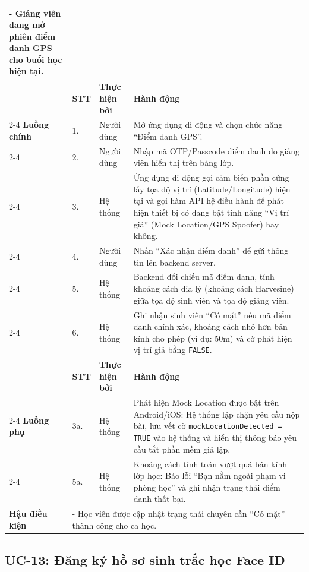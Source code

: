 \documentclass[../DoAn.tex]{subfiles}
\begin{document}
\begin{longtable}{|p{2.8cm}|p{0.8cm}|p{2.2cm}|p{7.5cm}|}
{      - Giảng viên đang mở phiên điểm danh GPS cho buổi học hiện tại.} \\ \hline
     & \textbf{STT} & \textbf{Thực hiện bởi} & \textbf{Hành động} \\ \cline{2-4}
    \textbf{Luồng chính} & 1. & Người dùng & Mở ứng dụng di động và chọn chức năng ``Điểm danh GPS''. \\ \cline{2-4}
     & 2. & Người dùng & Nhập mã OTP/Passcode điểm danh do giảng viên hiển thị trên bảng lớp. \\ \cline{2-4}
     & 3. & Hệ thống & Ứng dụng di động gọi cảm biến phần cứng lấy tọa độ vị trí (Latitude/Longitude) hiện tại và gọi hàm API hệ điều hành để phát hiện thiết bị có đang bật tính năng ``Vị trí giả'' (Mock Location/GPS Spoofer) hay không. \\ \cline{2-4}
     & 4. & Người dùng & Nhấn ``Xác nhận điểm danh'' để gửi thông tin lên backend server. \\ \cline{2-4}
     & 5. & Hệ thống & Backend đối chiếu mã điểm danh, tính khoảng cách địa lý (khoảng cách Harvesine) giữa tọa độ sinh viên và tọa độ giảng viên. \\ \cline{2-4}
     & 6. & Hệ thống & Ghi nhận sinh viên ``Có mặt'' nếu mã điểm danh chính xác, khoảng cách nhỏ hơn bán kính cho phép (ví dụ: 50m) và cờ phát hiện vị trí giả bằng \texttt{FALSE}. \\ \hline
     & \textbf{STT} & \textbf{Thực hiện bởi} & \textbf{Hành động} \\ \cline{2-4}
    \textbf{Luồng phụ} & 3a. & Hệ thống & Phát hiện Mock Location được bật trên Android/iOS: Hệ thống lập chặn yêu cầu nộp bài, lưu vết cờ \texttt{mockLocationDetected = TRUE} vào hệ thống và hiển thị thông báo yêu cầu tắt phần mềm giả lập. \\ \cline{2-4}
     & 5a. & Hệ thống & Khoảng cách tính toán vượt quá bán kính lớp học: Báo lỗi ``Bạn nằm ngoài phạm vi phòng học'' và ghi nhận trạng thái điểm danh thất bại. \\ \hline
    \textbf{Hậu điều kiện} & \multicolumn{3}{p{10.9cm}|}{- Học viên được cập nhật trạng thái chuyên cần ``Có mặt'' thành công cho ca học.} \\ \hline
\end{longtable}

\subsection{UC-13: Đăng ký hồ sơ sinh trắc học Face ID}

\label{subsection:spec_uc_13}
\end{document}
